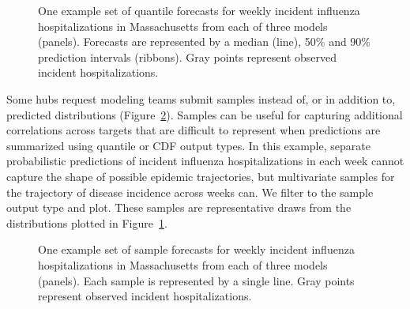 \documentclass[
]{article}
\begin{document}
\begin{figure}[H]


\caption{\label{fig-plot-ex-mods}One example set of quantile forecasts
for weekly incident influenza hospitalizations in Massachusetts from
each of three models (panels). Forecasts are represented by a median
(line), 50\% and 90\% prediction intervals (ribbons). Gray points
represent observed incident hospitalizations.}

\end{figure}%

Some hubs request modeling teams submit samples instead of, or in
addition to, predicted distributions
(Figure~\ref{fig-plot-ex-mod-samps}). Samples can be useful for
capturing additional correlations across targets that are difficult to
represent when predictions are summarized using quantile or CDF output
types. In this example, separate probabilistic predictions of incident
influenza hospitalizations in each week cannot capture the shape of
possible epidemic trajectories, but multivariate samples for the
trajectory of disease incidence across weeks can. We filter to the
sample output type and plot. These samples are representative draws from
the distributions plotted in Figure~\ref{fig-plot-ex-mods}.

\begin{figure}


\caption{\label{fig-plot-ex-mod-samps}One example set of sample
forecasts for weekly incident influenza hospitalizations in
Massachusetts from each of three models (panels). Each sample is
represented by a single line. Gray points represent observed incident
hospitalizations.}

\end{figure}%
\end{document}
